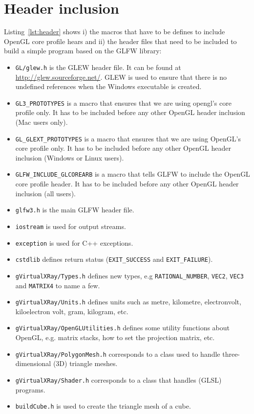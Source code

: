 \documentclass[11pt,oneside,a4paper,final]{article}
\begin{document}
\section{Header inclusion}
\label{sec:Header inclusion}

Listing~\ref{lst:header} shows i) the macros that have to be defines to include 
OpenGL core profile hears and ii) the header files that need to be included to 
build a simple program based on the GLFW 
library:
\begin{itemize}
 \item \verb+GL/glew.h+ is the GLEW header file. It can be found at 
  \url{http://glew.sourceforge.net/}. GLEW is used to ensure that there is no 
  undefined references when the Windows executable is created.
 \item \verb+GL3_PROTOTYPES+ is a macro that ensures that we are using opengl's 
core profile only. It has to be included before any other OpenGL header 
inclusion (Mac users only).
 \item \verb+GL_GLEXT_PROTOTYPES+ is a macro that ensures that we are using 
OpenGL's core profile only. It has to be included before any other OpenGL header 
inclusion (Windows or Linux users).
 \item \verb+GLFW_INCLUDE_GLCOREARB+ is a macro that tells GLFW to include the 
OpenGL core profile header. It has to be included before any other OpenGL header 
inclusion (all users).
 \item \verb+glfw3.h+ is the main GLFW header file.
 \item \verb+iostream+ is used for output streams.
 \item \verb+exception+ is used for C++ exceptions.
 \item \verb+cstdlib+ defines return status (\verb+EXIT_SUCCESS+ and 
	\verb+EXIT_FAILURE+).
 \item \verb+gVirtualXRay/Types.h+ defines new types, e.g 
\verb+RATIONAL_NUMBER+, 
	\verb+VEC2+, \verb+VEC3+ and \verb+MATRIX4+ to name a few.
 \item \verb+gVirtualXRay/Units.h+ defines units such as metre, kilometre, 
electronvolt, 
	kiloelectron volt, gram, kilogram, etc.
 \item \verb+gVirtualXRay/OpenGLUtilities.h+ defines some utility functions 
about OpenGL, 
	e.g. matrix stacks, how to set the projection matrix, etc.
 \item \verb+gVirtualXRay/PolygonMesh.h+ corresponds to a class used to handle 
three-dimensional (3D) triangle meshes.
 \item \verb+gVirtualXRay/Shader.h+ corresponds to a class that handles 
(GLSL) programs.
 \item \verb+buildCube.h+ is used to create the triangle mesh of a cube.
\end{itemize}
\end{document}
